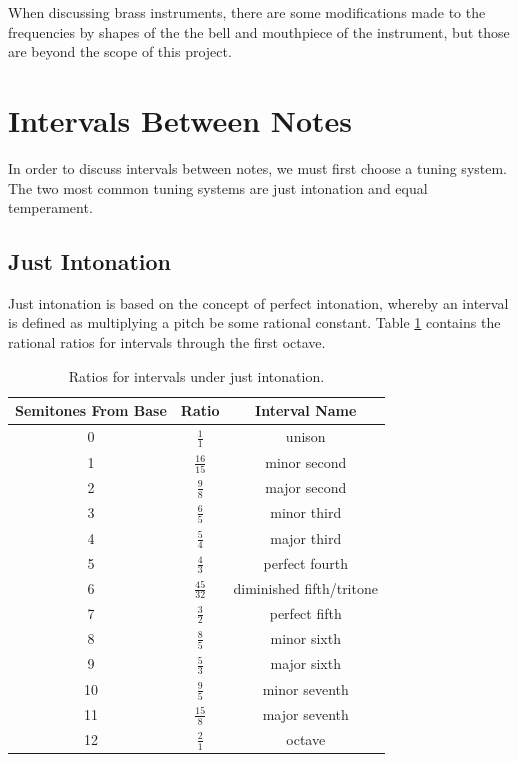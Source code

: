 When discussing brass instruments, there are some modifications made to the frequencies by shapes of the the bell and mouthpiece of the instrument, but those are beyond the scope of this project.


\section{Intervals Between Notes} \label{mathinmusic:intervals}

In order to discuss intervals between notes, we must first choose a tuning system.
The two most common tuning systems are just intonation and equal temperament.

\subsection{Just Intonation} \label{mathinmusic:intervals:just}

Just intonation is based on the concept of perfect intonation, whereby an interval is defined as multiplying a pitch be some rational constant.
Table \ref{table:justintervals} contains the rational ratios for intervals through the first octave.

\begin{table}
	\centering
	\begin{tabular}{c c c}
		Semitones From Base & Ratio & Interval Name\\
		\hline
		0 & $\frac{1}{1}$ & unison\\[4pt]
		1 & $\frac{16}{15}$ & minor second\\[4pt]
		2 & $\frac{9}{8}$ & major second\\[4pt]
		3 & $\frac{6}{5}$ & minor third\\[4pt]
		4 & $\frac{5}{4}$ & major third\\[4pt]
		5 & $\frac{4}{3}$ & perfect fourth\\[4pt]
		6 & $\frac{45}{32}$ & diminished fifth/tritone\\[4pt]
		7 & $\frac{3}{2}$ & perfect fifth\\[4pt]
		8 & $\frac{8}{5}$ & minor sixth\\[4pt]
		9 & $\frac{5}{3}$ & major sixth\\[4pt]
		10 & $\frac{9}{5}$ & minor seventh\\[4pt]
		11 & $\frac{15}{8}$ & major seventh\\[4pt]
		12 & $\frac{2}{1}$ & octave
	\end{tabular}
	\caption{Ratios for intervals under just intonation.}
	\label{table:justintervals}
\end{table}

